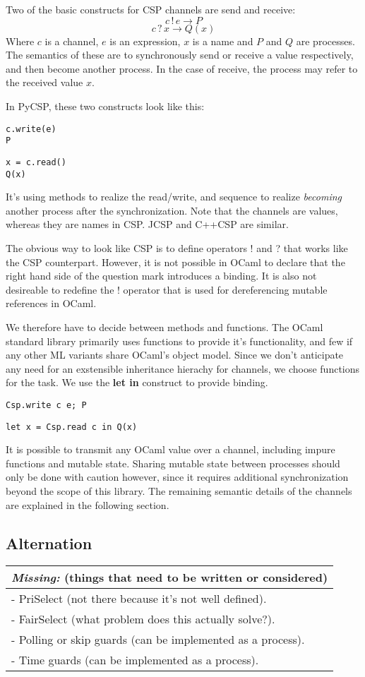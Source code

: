 \documentclass[a4paper,12pt]{article}
\newcommand{\missing}[1]{
  \begin{tabular}{|p{11cm}|}
    \hline
    \emph{Missing:} {\scriptsize (things that need to be written or considered)} \\
    \hline
    #1
    \hline
  \end{tabular}
}
\begin{document}
Two of the basic constructs for CSP channels are send and receive:
\[c\,!\,e \to P\]
\[c\,?\,x \to Q(x)\]
Where $c$ is a channel, $e$ is an expression, $x$ is a name and $P$ and $Q$ are processes. 
The semantics of these are to synchronously send or receive a value respectively, and
then become another process. In the case of receive, the process may refer to the
received value $x$.

In PyCSP, these two constructs look like this:
\begin{verbatim}
c.write(e)
P
\end{verbatim}
\begin{verbatim}
x = c.read()
Q(x)
\end{verbatim}
It's using methods to realize the read/write, and sequence to realize \emph{becoming}
another process after the synchronization. Note that the channels are values, whereas
they are names in CSP. JCSP and C++CSP are similar.

The obvious way to look like CSP is to define operators ! and ? that works like the
CSP counterpart. However, it is not possible in OCaml to declare that the right hand 
side of the question mark introduces a binding. It is also not desireable to redefine
the ! operator that is used for dereferencing mutable references in OCaml.

We therefore have to decide between methods and functions. The OCaml standard library
primarily uses functions to provide it's functionality, and few if any other ML 
variants share OCaml's object model. Since we don't anticipate any need for an
exstensible inheritance hierachy for channels, we choose functions for the task.
We use the \textbf{let in} construct to provide binding.

\begin{verbatim}
Csp.write c e; P
\end{verbatim}
\begin{verbatim}
let x = Csp.read c in Q(x)
\end{verbatim}

It is possible to transmit any OCaml value over a channel, including impure functions and mutable 
state. Sharing mutable state between processes should only be done with caution however, since it 
requires additional synchronization beyond the scope of this library. The remaining semantic 
details of the channels are explained in the following section.

\subsection{Alternation}
\missing{
- PriSelect (not there because it's not well defined).\\
- FairSelect (what problem does this actually solve?).\\
- Polling or skip guards (can be implemented as a process). \\
- Time guards (can be implemented as a process). \\
}
\end{document}
